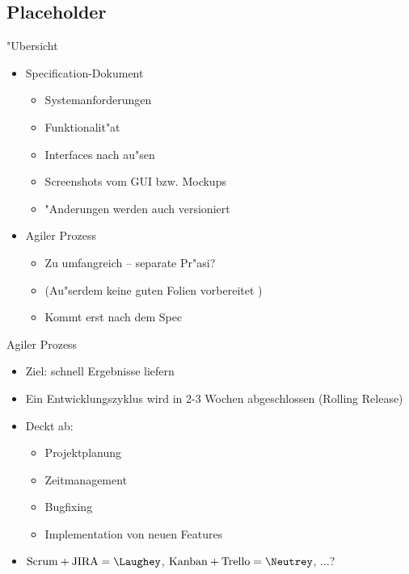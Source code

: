 \documentclass{beamer}
\begin{document}
\subsection{Placeholder}

\begin{frame}{"Ubersicht}
	\begin{itemize}
		\item Specification-Dokument
			\begin{itemize}
				\item Systemanforderungen
				\item Funktionalit"at
				\item Interfaces nach au"sen
				\item Screenshots vom GUI bzw. Mockups
				\item "Anderungen werden auch versioniert
			\end{itemize}
		\item Agiler Prozess
			\begin{itemize}
				\item Zu umfangreich -- separate Pr"asi?
				\item (Au"serdem keine guten Folien vorbereitet \Sadey)
				\item Kommt erst nach dem Spec
			\end{itemize}
	\end{itemize}
\end{frame}

\begin{frame}{Agiler Prozess}
	\begin{itemize}
		\item Ziel: schnell Ergebnisse liefern
		\item Ein Entwicklungszyklus wird in 2-3 Wochen abgeschlossen (Rolling Release)
		\item Deckt ab:
			\begin{itemize}
				\item Projektplanung
				\item Zeitmanagement
				\item Bugfixing
				\item Implementation von neuen Features
			\end{itemize}
		\item $\text{Scrum} + \text{JIRA} = \Laughey$, $\text{Kanban} + \text{Trello} = \Neutrey$, $\ldots$?
	\end{itemize}
\end{frame}
\end{document}
